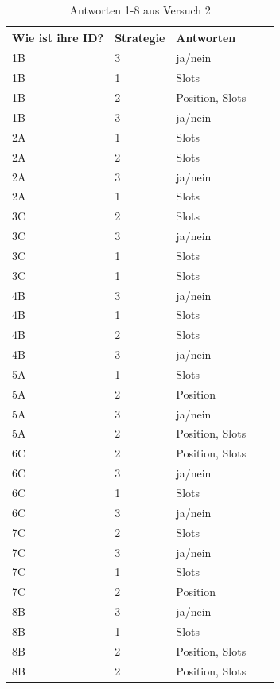 \documentclass[12pt,a4paper]{scrartcl}
\begin{document}
\begin{appendix}
\begin{table}
\centering
\caption{Antworten 1-8 aus Versuch 2}
\begin{tabular}{ | l | l | l | l | l | }
\hline
Wie ist ihre ID? & Strategie & Antworten \\ \hline \hline
1B & 3 & ja/nein \\ \hline
	1B & 1 & Slots \\ \hline
	1B & 2 & Position, Slots \\ \hline
	1B & 3 & ja/nein \\ \hline \hline
	2A & 1 & Slots \\ \hline
	2A & 2 & Slots \\ \hline
	2A & 3 & ja/nein \\ \hline
	2A & 1 & Slots \\ \hline \hline
	3C & 2 & Slots \\ \hline
	3C & 3 & ja/nein \\ \hline
	3C & 1 & Slots \\ \hline
	3C & 1 & Slots \\ \hline \hline
	4B & 3 & ja/nein \\ \hline
	4B & 1 & Slots \\ \hline
	4B & 2 & Slots \\ \hline
	4B & 3 & ja/nein \\ \hline \hline
	5A & 1 & Slots \\ \hline
	5A & 2 & Position \\ \hline
	5A & 3 & ja/nein \\ \hline
	5A & 2 & Position, Slots \\ \hline \hline
	6C & 2 & Position, Slots \\ \hline
	6C & 3 & ja/nein \\ \hline
	6C & 1 & Slots \\ \hline
	6C & 3 & ja/nein \\ \hline \hline
	7C & 2 & Slots \\ \hline
	7C & 3 & ja/nein \\ \hline
	7C & 1 & Slots \\ \hline
	7C & 2 & Position \\ \hline \hline
	8B & 3 & ja/nein \\ \hline
	8B & 1 & Slots \\ \hline
	8B & 2 & Position, Slots \\ \hline
	8B & 2 & Position, Slots \\ \hline 
\end{tabular}


\end{table}
\end{appendix}
\end{document}
